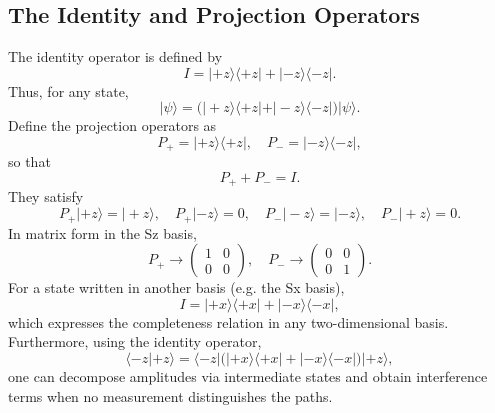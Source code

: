 \documentclass[twocolumn]{article}
\begin{document}
\begin{spacing}{1}
  \subsection{The Identity and Projection Operators}
  The identity operator is defined by
  \[
  I = |+z\rangle\langle+z| + |-z\rangle\langle -z|.
  \]
  Thus, for any state,
  \[
  |\psi\rangle = \Big(|+z\rangle\langle+z|+|-z\rangle\langle -z|\Big)|\psi\rangle.
  \]
  Define the projection operators as
  \[
  P_{+} = |+z\rangle\langle+z|,\quad P_{-} = |-z\rangle\langle-z|,
  \]
  so that
  \[
  P_{+}+P_{-}=I.
  \]
  They satisfy
  \[
  P_{+}|+z\rangle = |+z\rangle,\quad P_{+}|-z\rangle = 0,\quad P_{-}|-z\rangle = |-z\rangle,\quad P_{-}|+z\rangle = 0.
  \]
  In matrix form in the Sz basis,
  \[
  P_{+} \longrightarrow \begin{pmatrix}1 & 0\\0 & 0\end{pmatrix},\quad
  P_{-} \longrightarrow \begin{pmatrix}0 & 0\\0 & 1\end{pmatrix}.
  \]
  For a state written in another basis (e.g. the Sx basis),
  \[
  I = |+x\rangle\langle+x| + |-x\rangle\langle-x|,
  \]
  which expresses the completeness relation in any two-dimensional basis.
  Furthermore, using the identity operator,
  \[
  \langle -z|+z\rangle = \langle -z| \Big(|+x\rangle\langle+x|+|-x\rangle\langle-x|\Big)|+z\rangle,
  \]
  one can decompose amplitudes via intermediate states and obtain interference terms when no measurement distinguishes the paths.
  

\end{spacing}
\end{document}
